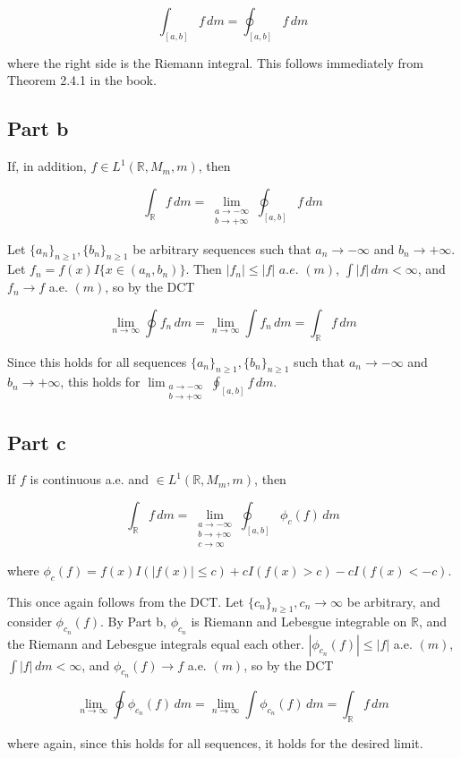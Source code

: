 \documentclass{article}
\newcommand{\R}{\mathbb{R}}
\begin{document}
\[
\int_{[a,b]} f\,dm = \oint_{[a,b]} f\,dm
\]

where the right side is the Riemann integral. This follows immediately from Theorem 2.4.1 in the book.

\subsection*{Part b}

If, in addition, $f \in L^1(\R, M_m, m)$, then

\[
\int_{\R} f\,dm = \lim_{\substack{a \rightarrow -\infty \\ b \rightarrow +\infty}} \oint_{[a,b]} f\,dm
\]

Let $\{a_n\}_{n \geq 1}, \{b_n\}_{n \geq 1}$ be arbitrary sequences such that $a_n \rightarrow -\infty$ and $b_n \rightarrow +\infty$. Let $f_n = f(x)I\{x \in (a_n, b_n)\}$. Then $|f_n| \leq |f|$ $a.e.$ $(m)$, $\int |f| \,dm < \infty$, and $f_n \rightarrow f$ a.e. $(m)$, so by the DCT

\[
\lim_{n \rightarrow \infty} \oint f_n\,dm = \lim_{n \rightarrow \infty} \int f_n\,dm = \int _\R f\,dm
\]

Since this holds for all sequences $\{a_n\}_{n \geq 1}, \{b_n\}_{n \geq 1}$ such that $a_n \rightarrow -\infty$ and $b_n \rightarrow +\infty$, this holds for $\lim_{\substack{a \rightarrow -\infty \\ b \rightarrow +\infty}} \oint_{[a,b]} f\,dm$.

\subsection*{Part c}

If $f$ is continuous a.e. and $\in L^1(\R, M_m, m)$, then

\[
\int_{\R} f\,dm = \lim_{\substack{a \rightarrow -\infty \\ b \rightarrow +\infty \\ c \rightarrow \infty}} \oint_{[a,b]} \phi_c(f)\,dm
\]

where $\phi_c(f) = f(x)I(|f(x)|\leq c) + cI(f(x) > c) - cI(f(x)<-c)$.

This once again follows from the DCT. Let $\{c_n\}_{n \geq 1}, c_n \rightarrow \infty$ be arbitrary, and consider $\phi_{c_n}(f)$. By Part b, $\phi_{c_n}$ is Riemann and Lebesgue integrable on $\R$, and the Riemann and Lebesgue integrals equal each other. $|\phi_{c_n}(f)| \leq |f|$ a.e. $(m)$, $\int |f|\,dm < \infty$, and $\phi_{c_n}(f) \rightarrow f$ a.e. $(m)$, so by the DCT

\[
\lim_{n \rightarrow \infty} \oint \phi_{c_n}(f)\,dm = \lim_{n \rightarrow \infty} \int \phi_{c_n}(f)\,dm = \int_\R f\,dm
\]

where again, since this holds for all sequences, it holds for the desired limit.
\end{document}
